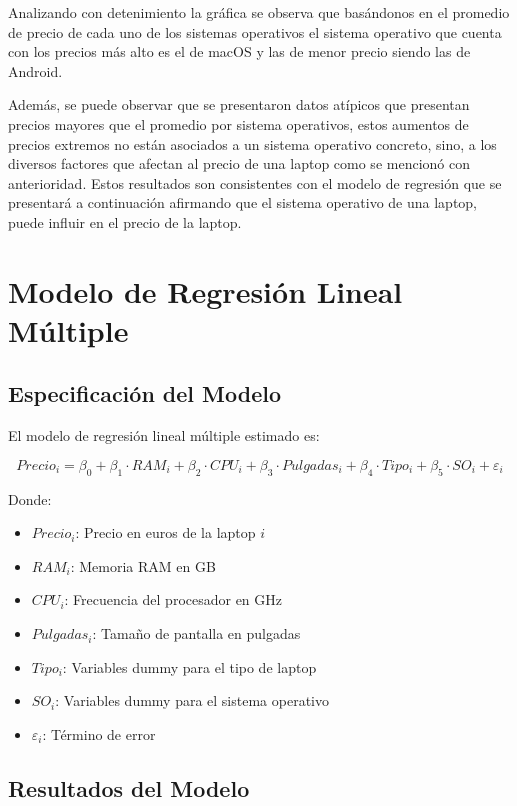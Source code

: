 \documentclass[12pt,a4paper]{article}
\begin{document}
Analizando con detenimiento la gráfica se observa que basándonos en el promedio de precio de cada uno de los sistemas operativos el sistema operativo que cuenta con los precios más alto es el de macOS y las de menor precio siendo las de Android.

Además, se puede observar que se presentaron datos atípicos que presentan precios mayores que el promedio por sistema operativos, estos aumentos de precios extremos no están asociados a un sistema operativo concreto, sino, a los diversos factores que afectan al precio de una laptop como se mencionó con anterioridad. Estos resultados son consistentes con el modelo de regresión que se presentará a continuación afirmando que el sistema operativo de una laptop, puede influir en el precio de la laptop.


\section{Modelo de Regresión Lineal Múltiple}

\subsection{Especificación del Modelo}

El modelo de regresión lineal múltiple estimado es:

\begin{equation}
    Precio_i = \beta_0 + \beta_1 \cdot RAM_i + \beta_2 \cdot CPU_i + \beta_3 \cdot Pulgadas_i + \beta_4 \cdot Tipo_i + \beta_5 \cdot SO_i + \varepsilon_i
\end{equation}

Donde:
\begin{itemize}
    \item $Precio_i$: Precio en euros de la laptop $i$
    \item $RAM_i$: Memoria RAM en GB
    \item $CPU_i$: Frecuencia del procesador en GHz
    \item $Pulgadas_i$: Tamaño de pantalla en pulgadas
    \item $Tipo_i$: Variables dummy para el tipo de laptop
    \item $SO_i$: Variables dummy para el sistema operativo
    \item $\varepsilon_i$: Término de error
\end{itemize}

\subsection{Resultados del Modelo}
\end{document}
